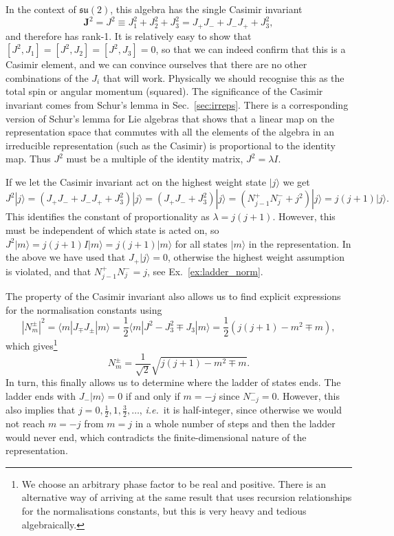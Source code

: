 \documentclass[notes.tex]{subfiles}
\begin{document}
In the context of $\mathfrak{su}(2)$, this algebra has the single Casimir invariant
\[ \mathbf J^2=J^2\equiv J_1^2+J_2^2+J_3^2=J_+J_-+J_-J_++J_3^2, \]
and therefore has rank-1. It is relatively easy to show that $[J^2,J_1]=[J^2,J_2]=[J^2,J_3]=0$, so that we can indeed confirm that this is a Casimir element, and we can convince ourselves that there are no other combinations of the $J_i$ that will work. Physically we should recognise this as the total spin or angular momentum (squared). The significance of the Casimir invariant comes from Schur's lemma in Sec.~\ref{sec:irreps}. There is a corresponding version of Schur's lemma for Lie algebras that shows that a linear map on the representation space that commutes with all the elements of the algebra in an irreducible representation (such as the Casimir) is proportional to the identity map. Thus $J^2$ must be a multiple of the identity matrix, $J^2=\lambda I$.

If we let the Casimir invariant act on the highest weight state $|j\rangle$ we get
\[ J^2 |j\rangle=(J_+J_-+J_-J_++J_3^2) |j\rangle=(J_+J_-+J_3^2) |j\rangle=(N_{j-1}^+N_j^-+j^2) |j\rangle=j(j+1) |j\rangle. \]
This identifies the constant of proportionality as $\lambda = j(j+1)$. However, this must be independent of which state is acted on, so $J^2|m\rangle=j(j+1)I|m\rangle=j(j+1)|m\rangle$ for all states $|m\rangle$ in the representation.
In the above we have used  that $J_+|j\rangle=0$, otherwise the highest weight assumption is violated, and that $N_{j-1}^+N_j^-=j$, see Ex.~\ref{ex:ladder_norm}.

The property of the Casimir invariant also allows us to find explicit expressions for the normalisation constants using
\[|N_m^\pm|^2= \langle m|J_\mp J_\pm |m\rangle
= \frac{1}{2}\langle m| J^2-J_3^2\mp J_3 |m\rangle=\frac{1}{2}( j(j+1)-m^2\mp m),  \]
which gives\footnote{We choose an arbitrary phase factor to be real and positive. There is an alternative way of arriving at the same result that uses recursion relationships for the normalisations constants, but this is very heavy and tedious algebraically.}
\begin{equation*}
N^\pm_m = \frac{1}{\sqrt{2}}\sqrt{ j(j+1)-m^2\mp m }.
\end{equation*}
In turn, this finally allows us to determine where the ladder of states ends. The ladder ends with $J_-|m\rangle=0$ if and only if $m=-j$ since $N_{-j}^-=0$. However, this also implies that $j=0,\frac{1}{2},1,\frac{3}{2},\ldots$, {\it i.e.}\ it is half-integer, since otherwise we would not reach $m=-j$ from $m=j$ in a whole number of steps and then the ladder would never end, which contradicts the finite-dimensional nature of the representation.
\end{document}
